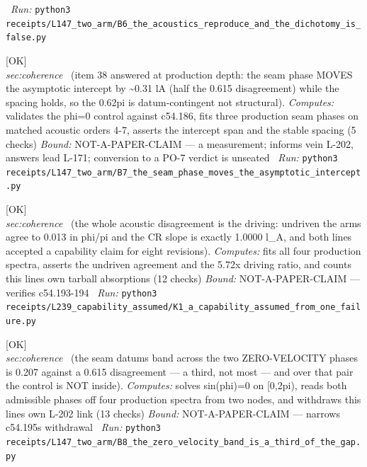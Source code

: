 \begin{description}
\ \emph{Run:} \texttt{python3 receipts/L147\_two\_arm/B6\_the\_acoustics\_reproduce\_and\_the\_dichotomy\_is\_false.py}
\item[\label{rcpt:B7_the_seam_phase_moves_the_asymptotic_intercept}\textbf{}\quad\texttt{B7\_the\_seam\_phase\_moves\_the\_asymptotic\_intercept}]\hfill\textsf{[OK]}\\
\textit{sec:coherence} \ (item 38 answered at production depth: the seam phase MOVES the asymptotic intercept by \textasciitilde{}0.31 lA (half the 0.615 disagreement) while the spacing holds, so the 0.62pi is datum-contingent not structural). 
\emph{Computes:} validates the phi=0 control against c54.186, fits three production seam phases on matched acoustic orders 4-7, asserts the intercept span and the stable spacing (5 checks)
 \emph{Bound:} NOT-A-PAPER-CLAIM --- a measurement; informs vein L-202, answers lead L-171; conversion to a PO-7 verdict is unseated
\ \emph{Run:} \texttt{python3 receipts/L147\_two\_arm/B7\_the\_seam\_phase\_moves\_the\_asymptotic\_intercept.py}
\item[\label{rcpt:K1_a_capability_assumed_from_one_failure}\textbf{}\quad\texttt{K1\_a\_capability\_assumed\_from\_one\_failure}]\hfill\textsf{[OK]}\\
\textit{sec:coherence} \ (the whole acoustic disagreement is the driving: undriven the arms agree to 0.013 in phi/pi and the CR slope is exactly 1.0000 l\_A, and both lines accepted a capability claim for eight revisions). 
\emph{Computes:} fits all four production spectra, asserts the undriven agreement and the 5.72x driving ratio, and counts this lines own tarball absorptions (12 checks)
 \emph{Bound:} NOT-A-PAPER-CLAIM --- verifies c54.193-194
\ \emph{Run:} \texttt{python3 receipts/L239\_capability\_assumed/K1\_a\_capability\_assumed\_from\_one\_failure.py}
\item[\label{rcpt:B8_the_zero_velocity_band_is_a_third_of_the_gap}\textbf{}\quad\texttt{B8\_the\_zero\_velocity\_band\_is\_a\_third\_of\_the\_gap}]\hfill\textsf{[OK]}\\
\textit{sec:coherence} \ (the seam datums band across the two ZERO-VELOCITY phases is 0.207 against a 0.615 disagreement --- a third, not most --- and over that pair the control is NOT inside). 
\emph{Computes:} solves sin(phi)=0 on [0,2pi), reads both admissible phases off four production spectra from two nodes, and withdraws this lines own L-202 link (13 checks)
 \emph{Bound:} NOT-A-PAPER-CLAIM --- narrows c54.195s withdrawal
\ \emph{Run:} \texttt{python3 receipts/L147\_two\_arm/B8\_the\_zero\_velocity\_band\_is\_a\_third\_of\_the\_gap.py}

\end{description}
